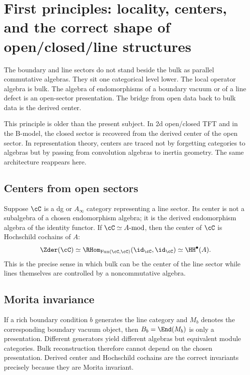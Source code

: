 \section{First principles: locality, centers, and the correct shape of open/closed/line structures}\label{sec:first-principles}

The boundary and line sectors do not stand beside the bulk as parallel commutative algebras. They sit one categorical level lower. The local operator algebra is bulk. The algebra of endomorphisms of a boundary vacuum or of a line defect is an open-sector presentation. The bridge from open data back to bulk data is the derived center.

This principle is older than the present subject. In 2d open/closed TFT and in the B-model, the closed sector is recovered from the derived center of the open sector. In representation theory, centers are traced not by forgetting categories to algebras but by passing from convolution algebras to inertia geometry. The same architecture reappears here.

\subsection{Centers from open sectors}

Suppose $\cC$ is a dg or $A_\infty$ category representing a line sector. Its center is not a subalgebra of a chosen endomorphism algebra; it is the derived endomorphism algebra of the identity functor. If $\cC\simeq A\text{-mod}$, then the center of $\cC$ is Hochschild cochains of $A$:
\[
\Zder(\cC)\simeq \RHom_{\operatorname{Fun}(\cC,\cC)}(\id_{\cC},\id_{\cC})\simeq \HH^\bullet(A).
\]
This is the precise sense in which bulk can be the center of the line sector while lines themselves are controlled by a noncommutative algebra.

\subsection{Morita invariance}

If a rich boundary condition $b$ generates the line category and $M_b$ denotes the corresponding boundary vacuum object, then $B_b=\End(M_b)$ is only a presentation. Different generators yield different algebras but equivalent module categories. Bulk reconstruction therefore cannot depend on the chosen presentation. Derived center and Hochschild cochains are the correct invariants precisely because they are Morita invariant.

